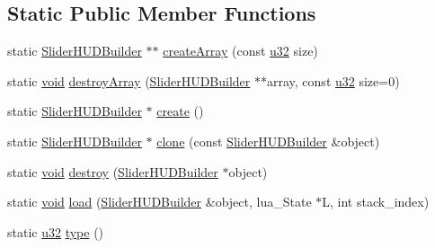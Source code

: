 \subsection*{Static Public Member Functions}
\begin{DoxyCompactItemize}
\item 
static \mbox{\hyperlink{classnjli_1_1_slider_h_u_d_builder}{Slider\+H\+U\+D\+Builder}} $\ast$$\ast$ \mbox{\hyperlink{classnjli_1_1_slider_h_u_d_builder_a680aaace6d70491bbe44a3fa1f559e05}{create\+Array}} (const \mbox{\hyperlink{_util_8h_a10e94b422ef0c20dcdec20d31a1f5049}{u32}} size)
\item 
static \mbox{\hyperlink{_thread_8h_af1e856da2e658414cb2456cb6f7ebc66}{void}} \mbox{\hyperlink{classnjli_1_1_slider_h_u_d_builder_aeeb254844ebeff53f2d4415e0b92d58f}{destroy\+Array}} (\mbox{\hyperlink{classnjli_1_1_slider_h_u_d_builder}{Slider\+H\+U\+D\+Builder}} $\ast$$\ast$array, const \mbox{\hyperlink{_util_8h_a10e94b422ef0c20dcdec20d31a1f5049}{u32}} size=0)
\item 
static \mbox{\hyperlink{classnjli_1_1_slider_h_u_d_builder}{Slider\+H\+U\+D\+Builder}} $\ast$ \mbox{\hyperlink{classnjli_1_1_slider_h_u_d_builder_a7445624612c77a91979b4613745aeff0}{create}} ()
\item 
static \mbox{\hyperlink{classnjli_1_1_slider_h_u_d_builder}{Slider\+H\+U\+D\+Builder}} $\ast$ \mbox{\hyperlink{classnjli_1_1_slider_h_u_d_builder_a71991a7d0a5a1058f1c7a381cb03cb2f}{clone}} (const \mbox{\hyperlink{classnjli_1_1_slider_h_u_d_builder}{Slider\+H\+U\+D\+Builder}} \&object)
\item 
static \mbox{\hyperlink{_thread_8h_af1e856da2e658414cb2456cb6f7ebc66}{void}} \mbox{\hyperlink{classnjli_1_1_slider_h_u_d_builder_a36c97ae77bfd67c0896fb12a18656e28}{destroy}} (\mbox{\hyperlink{classnjli_1_1_slider_h_u_d_builder}{Slider\+H\+U\+D\+Builder}} $\ast$object)
\item 
static \mbox{\hyperlink{_thread_8h_af1e856da2e658414cb2456cb6f7ebc66}{void}} \mbox{\hyperlink{classnjli_1_1_slider_h_u_d_builder_a0e18355fc8350c87ec0ac7e8ea2764b2}{load}} (\mbox{\hyperlink{classnjli_1_1_slider_h_u_d_builder}{Slider\+H\+U\+D\+Builder}} \&object, lua\+\_\+\+State $\ast$L, int stack\+\_\+index)
\item 
static \mbox{\hyperlink{_util_8h_a10e94b422ef0c20dcdec20d31a1f5049}{u32}} \mbox{\hyperlink{classnjli_1_1_slider_h_u_d_builder_ad7eb0696e32ce163c3bf7a90b26e3d1f}{type}} ()
\end{DoxyCompactItemize}
